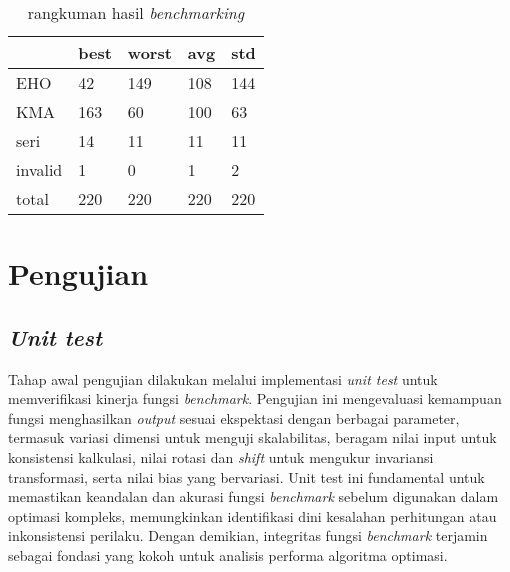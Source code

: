 \begin{table}[h!]
    \centering
    \caption{rangkuman hasil \textit{benchmarking}}
    \begin{tabular}{|l|l|l|l|l|}
    \hline
        & best & worst & avg & std \\ \hline
        EHO & 42 & 149 & 108 & 144 \\ \hline
        KMA & 163 & 60 & 100 & 63 \\ \hline
        seri & 14 & 11 & 11 & 11 \\ \hline
        invalid & 1 & 0 & 1 & 2 \\ \hline
        total & 220 & 220 & 220 & 220 \\ \hline
    \end{tabular}
    \label{summary-result}
\end{table}

\section{Pengujian}
\subsection{\textit{Unit test}}
Tahap awal pengujian dilakukan melalui implementasi \textit{unit test} untuk memverifikasi kinerja fungsi \textit{benchmark}. Pengujian ini mengevaluasi kemampuan fungsi menghasilkan \textit{output} sesuai ekspektasi dengan berbagai parameter, termasuk variasi dimensi untuk menguji skalabilitas, beragam nilai input untuk konsistensi kalkulasi, nilai rotasi dan \textit{shift} untuk mengukur invariansi transformasi, serta nilai bias yang bervariasi. Unit test ini fundamental untuk memastikan keandalan dan akurasi fungsi \textit{benchmark} sebelum digunakan dalam optimasi kompleks, memungkinkan identifikasi dini kesalahan perhitungan atau inkonsistensi perilaku. Dengan demikian, integritas fungsi \textit{benchmark} terjamin sebagai fondasi yang kokoh untuk analisis performa algoritma optimasi.

